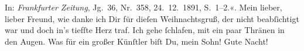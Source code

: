 \begin{ledgroupsized}[t]{13cm}
{{{                     In: \emph{Frankfurter Zeitung}, Jg. 36, Nr. 358,
                        24. 12. 1891, S. 1–2.}}}\label{K_L02677-3h}«. Mein lieber, lieber
               Freund, wie danke ich Dir für dieſen Weihnachtsgruß, der nicht beabſichtigt war und
               doch in’s tiefſte Herz traf. Ich gehe ſchlafen, mit ein paar Thränen in den Augen.
               Was für ein großer Künſtler biſt Du, mein Sohn!\pend
           \pstart
           Gute Nacht!\pend
           \endnumbering{}\end{ledgroupsized}  \newcommand{\dateiname}{L02677}\newcommand{\titel}{Paul Goldmann an Arthur Schnitzler, 24. 12. [1891]}\newcommand{\editorInnen}{Martin Anton Müller und Laura Untner}
      